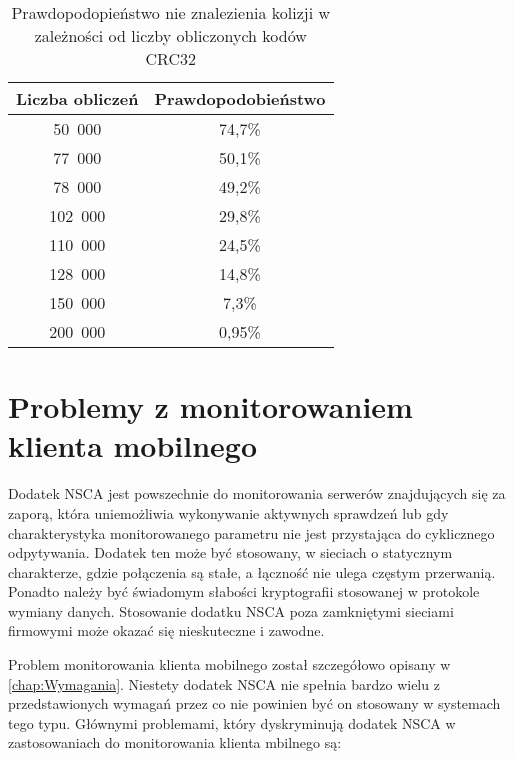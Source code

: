 \begin{table}
\centering
\caption{Prawdopodopieństwo nie znalezienia kolizji w zależności od
  liczby obliczonych kodów CRC32}
\label{tab:CRC32Colisions}
\begin{tabular}{|c|c|}
\hline
Liczba obliczeń & Prawdopodobieństwo \\
\hline
50~000 & 74,7\% \\
\hline
77~000 & 50,1\% \\
\hline
78~000 & 49,2\% \\
\hline
102~000 & 29,8\% \\
\hline
110~000 & 24,5\% \\
\hline
128~000 & 14,8\% \\
\hline
150~000 & 7,3\% \\
\hline
200~000 & 0,95\% \\
\hline
\end{tabular}
\end{table} 

\section[Problemy][Problemy z monitorowaniem klienta mobilnego]{Problemy z monitorowaniem klienta mobilnego}

Dodatek NSCA jest powszechnie do monitorowania serwerów znajdujących
się za zaporą, która uniemożliwia wykonywanie aktywnych sprawdzeń lub
gdy charakterystyka monitorowanego parametru nie jest przystająca do
cyklicznego odpytywania. Dodatek ten może być stosowany, w sieciach o
statycznym charakterze, gdzie połączenia są stałe, a łączność nie
ulega częstym przerwanią. Ponadto należy być świadomym słabości
kryptografii stosowanej w protokole wymiany danych. Stosowanie dodatku
NSCA poza zamkniętymi sieciami firmowymi może okazać się nieskuteczne
i zawodne.  

Problem monitorowania klienta mobilnego został szczegółowo opisany w
\ref{chap:Wymagania}. Niestety dodatek NSCA nie spełnia bardzo wielu z
przedstawionych wymagań przez co nie powinien być on stosowany w
systemach tego typu. Głównymi problemami, który dyskryminują dodatek
NSCA w zastosowaniach do monitorowania klienta mbilnego są:

